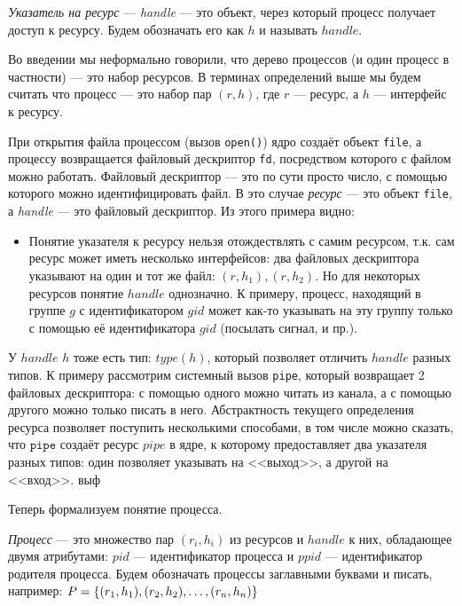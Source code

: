 \begin{defn}
\emph{Указатель на ресурс} --- \textit{handle} --- это объект, через который процесс получает доступ к ресурсу.
Будем обозначать его как $h$ и называть $handle$.
\end{defn}

Во введении мы неформально говорили, что дерево процессов (и один процесс в частности) --- это набор ресурсов. В 
терминах определений выше мы будем считать что процесс --- это набор пар $(r, h)$, где $r$ --- ресурс, а $h$ --- 
интерфейс к ресурсу.

\begin{exmp}
При открытия файла процессом (вызов \texttt{open()}) ядро создаёт объект \texttt{file}, а процессу возвращается 
файловый дескриптор \texttt{fd}, посредством которого с файлом можно работать. Файловый дескриптор --- это по сути 
просто число, с помощью которого можно идентифицировать файл. В это случае \emph{ресурс} --- это объект \texttt{file}, 
а \emph{handle} --- это файловый дескриптор. Из этого примера видно:
\begin{itemize}
	\item Понятие указателя к ресурсу нельзя отождествлять с самим ресурсом, т.к. сам ресурс может иметь несколько 
	интерфейсов: два файловых дескриптора указывают на один и тот же файл: $(r, h_1), (r, h_2)$. Но для некоторых 
	ресурсов понятие $handle$ однозначно. К примеру, процесс, находящий в группе $g$ с идентификатором $gid$ может 
	как-то указывать на эту группу только с помощью её идентификатора $gid$ (посылать сигнал, и пр.).
\end{itemize}
\end{exmp}

У $handle$ $h$ тоже есть тип: $type(h)$, который позволяет отличить $handle$ разных типов. К примеру рассмотрим 
системный вызов \texttt{pipe}, который возвращает 2 файловых дескриптора: с помощью одного можно читать из канала, а с 
помощью другого можно только писать в него. Абстрактность текущего определения ресурса позволяет поступить несколькими 
способами, в том числе можно сказать, что $\texttt{pipe}$ создаёт ресурс $pipe$ в ядре, к которому предоставляет два 
указателя разных типов: один позволяет указывать на <<выход>>, а другой на <<вход>>. выф

Теперь формализуем понятие процесса.

\begin{defn}
\emph{Процесс} --- это множество пар $(r_i, h_i)$ из ресурсов и $handle$ к них, обладающее двумя атрибутами: $pid$ --- 
идентификатор процесса и $ppid$ --- идентификатор родителя процесса. Будем обозначать процессы заглавными буквами и 
писать, например: $P = \left\lbrace (r_1, h_1), (r_2, h_2), \ldots, (r_n, h_n) \right\rbrace$
\end{defn}

